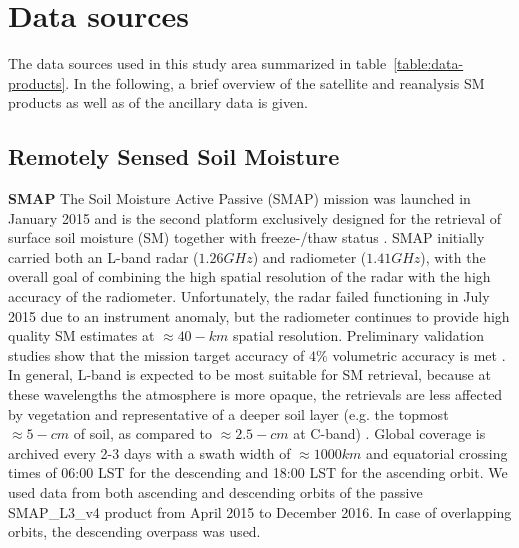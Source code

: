 \documentclass[hess, manuscript]{copernicus}
\begin{document}
\newpage
\section{Data sources}
\label{sec:data}
The data sources used in this study area summarized in table~\ref{table:data-products}. In the following, a brief overview of the satellite and reanalysis SM products as well as of the ancillary data is given. 
\subsection{Remotely Sensed Soil Moisture}
\textbf{SMAP} 
The Soil Moisture Active Passive (SMAP) mission was launched in January 2015 and is the second platform exclusively designed for the retrieval of surface soil moisture (SM) together with freeze-/thaw status \citep{entekhabi2010soil}. SMAP initially carried both an L-band radar ($1.26 GHz$) and radiometer ($1.41 GHz$), with the overall goal of combining the high spatial resolution of the radar with the high accuracy of the radiometer. Unfortunately, the radar failed functioning in July 2015 due to an instrument anomaly, but the radiometer continues to provide high quality SM estimates at $\approx 40-km$ spatial resolution. Preliminary validation studies show that the mission target accuracy of $4\%$ volumetric accuracy is met \citep{colliander2017validation}. In general, L-band is expected to be most suitable for SM retrieval, because at these wavelengths the atmosphere is more opaque, the retrievals are less affected by vegetation and representative of a deeper soil layer (e.g. the topmost $\approx 5-cm$ of soil, as compared to $\approx 2.5-cm$ at C-band) \citep{entekhabi2010soil}. Global coverage is archived every 2-3 days with a swath width of $\approx 1000 km$ and equatorial crossing times of 06:00 LST for the descending and 18:00 LST for the ascending orbit. We used data from both ascending and descending orbits of the passive SMAP\_L3\_v4 product from April 2015 to December 2016. In case of overlapping orbits, the descending overpass was used.\\ 
\end{document}
